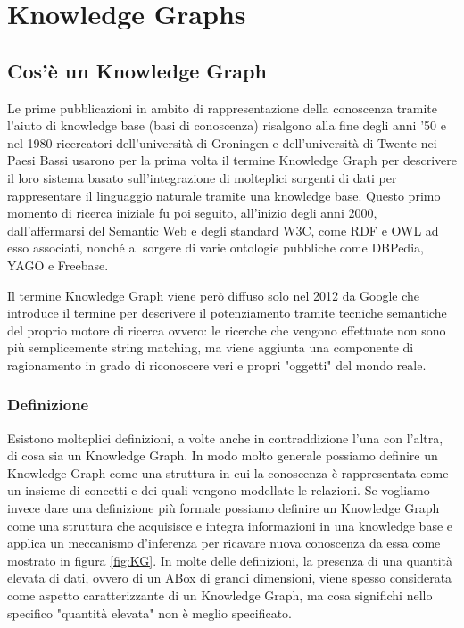 \chapter{Knowledge Graphs}
\label{cha:vkg}

\section{Cos'è un Knowledge Graph}
\label{sec:kg_description}

Le prime pubblicazioni in ambito di rappresentazione della conoscenza tramite l'aiuto di knowledge base (basi di conoscenza) risalgono alla fine degli anni '50 e nel 1980 ricercatori dell'università di Groningen 
e dell'università di Twente nei Paesi Bassi usarono per la prima volta il termine Knowledge Graph per descrivere il loro sistema basato sull'integrazione di molteplici sorgenti
di dati per rappresentare il linguaggio naturale tramite una knowledge base.
Questo primo momento di ricerca iniziale fu poi seguito, all'inizio degli anni 2000, dall'affermarsi del Semantic Web e degli standard W3C, come RDF e OWL ad esso associati,
nonché al sorgere di varie ontologie pubbliche come DBPedia, YAGO e Freebase. \cite{KGDefinition} \cite{KGSurvey}

Il termine Knowledge Graph viene però diffuso solo nel 2012 da Google che introduce il termine per descrivere il potenziamento tramite tecniche semantiche del proprio motore di ricerca ovvero: 
le ricerche che vengono effettuate non sono più semplicemente string matching, ma viene aggiunta una componente di ragionamento in grado di riconoscere veri e propri "oggetti" del 
mondo reale. \cite{KGDefinition}

\subsection{Definizione}
Esistono molteplici definizioni, a volte anche in contraddizione l'una con l'altra, di cosa sia un Knowledge Graph.
In modo molto generale possiamo definire un Knowledge Graph come una struttura in cui la conoscenza è rappresentata come un insieme di concetti e dei quali vengono modellate le relazioni.
Se vogliamo invece dare una definizione più formale possiamo definire un Knowledge Graph come una struttura che acquisisce e integra informazioni in una knowledge base
e applica un meccanismo d'inferenza per ricavare nuova conoscenza da essa come mostrato in figura \ref{fig:KG}.
In molte delle definizioni, la presenza di una quantità elevata di dati, ovvero di un ABox di grandi dimensioni, viene spesso considerata come aspetto caratterizzante di un Knowledge Graph,
ma cosa significhi nello specifico "quantità elevata" non è meglio specificato. \cite{KGDefinition}

